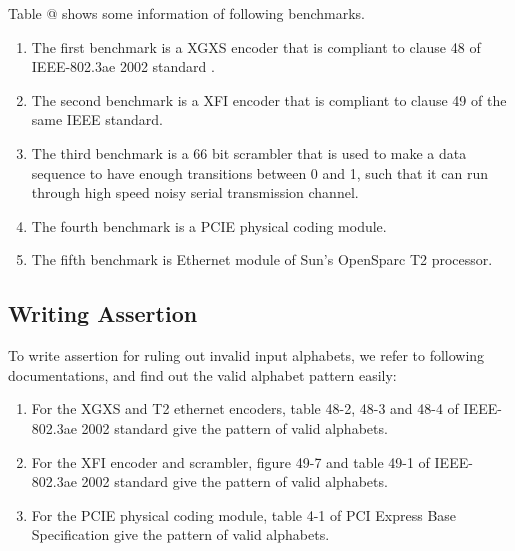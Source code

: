 \documentclass[journal]{IEEEtran}
\makeatletter
\newcommand{\Rmnum}[1]{\expandafter\@slowromancap\romannumeral #1@}
\makeatother
\begin{document}
Table \Rmnum{1} shows some information of following benchmarks.
\begin{enumerate}
  \item The first benchmark is a XGXS encoder that is compliant to clause 48 of IEEE-802.3ae 2002 standard \cite{IEEE80232002}.
  \item The second benchmark is a XFI encoder that is compliant to clause 49 of the same IEEE standard.
  \item The third benchmark is a 66 bit scrambler that is used to make a data sequence to have enough transitions between 0 and 1,
        such that it can run through high speed noisy serial transmission channel.
  \item The fourth benchmark is a PCIE physical coding module.
  \item The fifth benchmark is Ethernet module of Sun's OpenSparc T2 processor.
\end{enumerate}


\subsection{Writing Assertion}
To write assertion for ruling out invalid input alphabets,
we refer to following documentations,
and find out the valid alphabet pattern easily:
\begin{enumerate}
  \item For the XGXS and T2 ethernet encoders,
  table 48-2, 48-3 and 48-4 of IEEE-802.3ae 2002 standard \cite{IEEE80232002} give the pattern of valid alphabets.
  \item For the XFI encoder and scrambler,
  figure 49-7 and table 49-1 of IEEE-802.3ae 2002 standard \cite{IEEE80232002} give the pattern of valid alphabets.
  \item For the PCIE physical coding module,
  table 4-1 of PCI Express Base Specification \cite{PCIESPEC} give the pattern of valid alphabets.
\end{enumerate}
\end{document}
